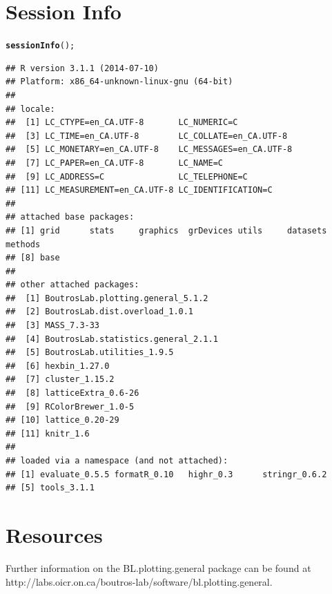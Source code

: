 \documentclass[letterpaper]{article}\usepackage[]{graphicx}\usepackage[]{color}
\makeatletter
\newcommand{\hlstd}[1]{\textcolor[rgb]{0.345,0.345,0.345}{#1}}%
\newcommand{\hlkwd}[1]{\textcolor[rgb]{0.737,0.353,0.396}{\textbf{#1}}}%
\newenvironment{kframe}{%
 \def\at@end@of@kframe{}%
 \ifinner\ifhmode%
  \def\at@end@of@kframe{\end{minipage}}%
  \begin{minipage}{\columnwidth}%
 \fi\fi%
 \def\FrameCommand##1{\hskip\@totalleftmargin \hskip-\fboxsep
 \colorbox{shadecolor}{##1}\hskip-\fboxsep
     \hskip-\linewidth \hskip-\@totalleftmargin \hskip\columnwidth}%
 \MakeFramed {\advance\hsize-\width
   \@totalleftmargin\z@ \linewidth\hsize
   \@setminipage}}%
 {\par\unskip\endMakeFramed%
 \at@end@of@kframe}
\newenvironment{knitrout}{}{} %
\makeatother
\begin{document}
\section{Session Info}
\begin{knitrout}
\color{fgcolor}\begin{kframe}
\begin{alltt}
\hlkwd{sessionInfo}\hlstd{();}
\end{alltt}
\begin{verbatim}
## R version 3.1.1 (2014-07-10)
## Platform: x86_64-unknown-linux-gnu (64-bit)
## 
## locale:
##  [1] LC_CTYPE=en_CA.UTF-8       LC_NUMERIC=C              
##  [3] LC_TIME=en_CA.UTF-8        LC_COLLATE=en_CA.UTF-8    
##  [5] LC_MONETARY=en_CA.UTF-8    LC_MESSAGES=en_CA.UTF-8   
##  [7] LC_PAPER=en_CA.UTF-8       LC_NAME=C                 
##  [9] LC_ADDRESS=C               LC_TELEPHONE=C            
## [11] LC_MEASUREMENT=en_CA.UTF-8 LC_IDENTIFICATION=C       
## 
## attached base packages:
## [1] grid      stats     graphics  grDevices utils     datasets  methods  
## [8] base     
## 
## other attached packages:
##  [1] BoutrosLab.plotting.general_5.1.2  
##  [2] BoutrosLab.dist.overload_1.0.1     
##  [3] MASS_7.3-33                        
##  [4] BoutrosLab.statistics.general_2.1.1
##  [5] BoutrosLab.utilities_1.9.5         
##  [6] hexbin_1.27.0                      
##  [7] cluster_1.15.2                     
##  [8] latticeExtra_0.6-26                
##  [9] RColorBrewer_1.0-5                 
## [10] lattice_0.20-29                    
## [11] knitr_1.6                          
## 
## loaded via a namespace (and not attached):
## [1] evaluate_0.5.5 formatR_0.10   highr_0.3      stringr_0.6.2 
## [5] tools_3.1.1
\end{verbatim}
\end{kframe}
\end{knitrout}

\section{Resources}
Further information on the BL.plotting.general package can be found at  http://labs.oicr.on.ca/boutros-lab/software/bl.plotting.general.
\end{document}
